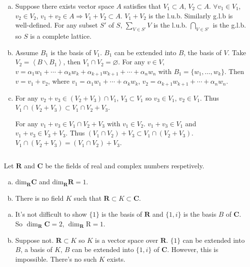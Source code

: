 \begin{answer}
    \begin{enumerate}[(a)]
        \item Suppose there exists vector space $A$ satisfies that $V_{1}\subset A$, $V_{2}\subset A$. $\forall v_{1}\in V_{1}$, $v_{2}\in V_{2}$, $v_{1}+v_{2}\in A\Rightarrow V_{1}+V_{2}\subset A$. $V_{1}+V_{2}$ is the l.u.b. Similarly g.l.b is well-defined. For any subset $S'$ of $S$, $\sum\limits_{V\in S'}V$ is the l.u.b. $\bigcap\limits_{V\in S'}$ is the g.l.b. so $S$ is a complete lattice.
        \item Assume $B_{1}$ is the basis of $V_{1}$. $B_{1}$ can be extended into $B$, the basis of $V$. Take $V_{2}=\left\langle B\backslash B_{1}\right\rangle$, then $V_{1}\cap V_{2}=\varnothing
        $. For any $v\in V$, $v=\alpha_{1}w_{1}+\cdots+\alpha_{k}w_{k}+\alpha_{k+1}w_{k+1}+\cdots+\alpha_{n}w_{n}$ with $B_{1}=\{w_{1},\dots, w_{k}\}$. Then $v=v_{1}+v_{2}$, where $v_{1}=\alpha_{1}w_{1}+\cdots+\alpha_{k}w_{k}$, $v_{2}=\alpha_{k+1}w_{k+1}+\cdots+\alpha_{n}w_{n}$.
        \item For any $v_{2}+v_{3}\in (V_{2}+V_{3})\cap V_{1}$, $V_{3}\subset V_{1}$ so $v_{3}\in V_{1}$, $v_{2}\in V_{1}$. Thus $V_{1}\cap (V_{2}+V_{3})\subset V_{1}\cap V_{2}+V_{3}$.
        
        For any $v_{1}+v_{3}\in V_{1}\cap V_{2}+V_{3}$ with $v_{1}\in V_{2}$. $v_{1}+v_{3}\in V_{1}$ and $v_{1}+v_{3}\in V_{3}+V_{3}$. Thus $(V_{1}\cap V_{2})+V_{3}\subset V_{1}\cap (V_{2}+V_{3})$. $V_{1}\cap (V_{2}+V_{3})=(V_{1}\cap V_{2})+V_{3}$.
    \end{enumerate}
\end{answer}

$$ $$

\begin{ex}
    Let $\mathbf{R}$ and $\mathbf{C}$ be the fields of real and complex numbers respetively.
    \begin{enumerate}[(a)]
        \item $\mathrm{dim}_{\mathbf{R}}\mathbf{C}$ and $\mathrm{dim}_{\mathbf{R}}\mathbf{R}=1$.
        \item There is no field $K$ such that $\mathbf{R}\subset K\subset\mathbf{C}$.
    \end{enumerate}
\end{ex}

\begin{answer}
    \begin{enumerate}[(a)]
        \item It's not difficult to show $\{1\}$ is the basis of $\mathbf{R}$ and $\{1,i\}$ is the basis $B$ of $\mathbf{C}$. So $\dim_{\mathbf{R}}\mathbf{C}=2$, $\dim_{\mathbf{R}}\mathrm{R}=1$.
        \item Suppose not. $\mathbf{R}\subset K$ so $K$ is a vector space over $\mathbf{R}$. $\{1\}$ can be extended into $B$, a basis of $K$, $B$ can be extended into $\{1,i\}$ of $\mathbf{C}$. However, this is impossible. There's no such $K$ exists.
    \end{enumerate}
\end{answer}

